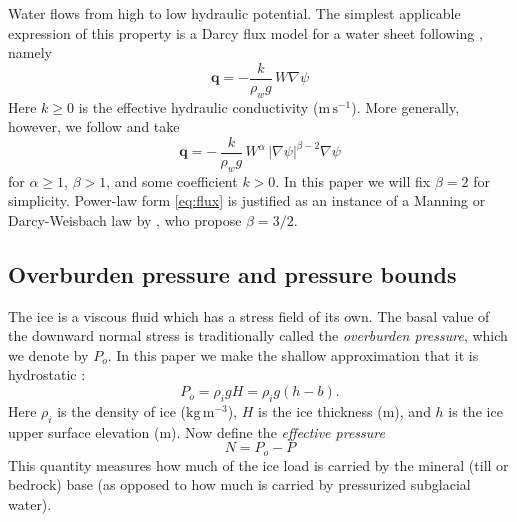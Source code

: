 \documentclass[11pt,final]{amsart}%
\newcommand\bq{\mathbf{q}}
\newcommand{\grad}{\nabla}
\begin{document}
Water flows from high to low hydraulic potential.  The simplest applicable expression of this property is a Darcy flux model for a water sheet following \cite{Clarke05}, namely
\begin{equation}  \label{eq:fluxearly}
\bq = - \frac{k}{\rho_w g}\,W \grad \psi
\end{equation}
Here $k \ge 0$ is the effective hydraulic conductivity ($\text{m}\,\text{s}^{-1}$).  More generally, however, we follow \cite{Schoofetal2012} and take
\begin{equation}  \label{eq:flux}
\bq = - \, \frac{k}{\rho_w g}\, W^\alpha\, |\grad \psi|^{\beta-2} \grad \psi
\end{equation}
for $\alpha \ge 1$, $\beta>1$, and some coefficient $k>0$.  In this paper we will fix $\beta=2$ for simplicity.  Power-law form \eqref{eq:flux} is justified as an instance of a Manning or Darcy-Weisbach law by \cite{Schoofetal2012}, who propose $\beta=3/2$.

\subsection*{Overburden pressure and pressure bounds}  The ice is a viscous fluid which has a stress field of its own.  The basal value of the downward normal stress is traditionally called the \emph{overburden pressure}, which we denote by $P_o$.  In this paper we make the shallow approximation that it is hydrostatic \citep{GreveBlatter2009}:
\begin{equation} \label{eq:hydrostatic}
  P_o = \rho_i g H = \rho_i g (h-b).
\end{equation}
Here $\rho_i$ is the density of ice ($\text{kg}\,\text{m}^{-3}$), $H$ is the ice thickness (m), and $h$ is the ice upper surface elevation (m).  Now define the \emph{effective pressure}
\begin{equation}
N = P_o - P\label{eq:effective}
\end{equation}
This quantity measures how much of the ice load is carried by the mineral (till or bedrock) base (as opposed to how much is carried by pressurized subglacial water).
\end{document}
